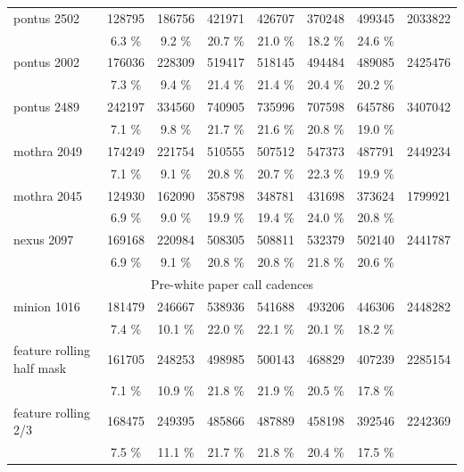 \documentclass [11pt,a4paper]{article}
\begin{document}
\begin{appendices}
\begin{longtable}{l|ccccccc}
\hline
         pontus 2502 &  128795 &  186756 &  421971 &  426707 &  370248 &  499345 &  2033822 \\ 
                     &    6.3 \% &    9.2 \% &   20.7 \% &   21.0 \% &   18.2 \% &   24.6 \% & \\
\hline
         pontus 2002 &  176036 &  228309 &  519417 &  518145 &  494484 &  489085 &  2425476 \\ 
                     &    7.3 \% &    9.4 \% &   21.4 \% &   21.4 \% &   20.4 \% &   20.2 \% & \\
\hline
         pontus 2489 &  242197 &  334560 &  740905 &  735996 &  707598 &  645786 &  3407042 \\ 
                     &    7.1 \% &    9.8 \% &   21.7 \% &   21.6 \% &   20.8 \% &   19.0 \% & \\
\hline
         mothra 2049 &  174249 &  221754 &  510555 &  507512 &  547373 &  487791 &  2449234 \\ 
                     &    7.1 \% &    9.1 \% &   20.8 \% &   20.7 \% &   22.3 \% &   19.9 \% & \\
\hline
         mothra 2045 &  124930 &  162090 &  358798 &  348781 &  431698 &  373624 &  1799921 \\ 
                     &    6.9 \% &    9.0 \% &   19.9 \% &   19.4 \% &   24.0 \% &   20.8 \% & \\
\hline
          nexus 2097 &  169168 &  220984 &  508305 &  508811 &  532379 &  502140 &  2441787 \\ 
                     &    6.9 \% &    9.1 \% &   20.8 \% &   20.8 \% &   21.8 \% &   20.6 \% & \\
\hline
\hline
\multicolumn{8}{c}{Pre-white paper call cadences}\\
\hline
         minion 1016 &  181479 &  246667 &  538936 &  541688 &  493206 &  446306 &  2448282 \\ 
                     &    7.4 \% &   10.1 \% &   22.0 \% &   22.1 \% &   20.1 \% &   18.2 \% & \\
\hline
feature rolling half mask &  161705 &  248253 &  498985 &  500143 &  468829 &  407239 &  2285154 \\ 
                     &    7.1 \% &   10.9 \% &   21.8 \% &   21.9 \% &   20.5 \% &   17.8 \% & \\
\hline
 feature rolling 2/3 &  168475 &  249395 &  485866 &  487889 &  458198 &  392546 &  2242369 \\ 
                     &    7.5 \% &   11.1 \% &   21.7 \% &   21.8 \% &   20.4 \% &   17.5 \% & \\

\end{longtable}
\end{appendices}
\end{document}

